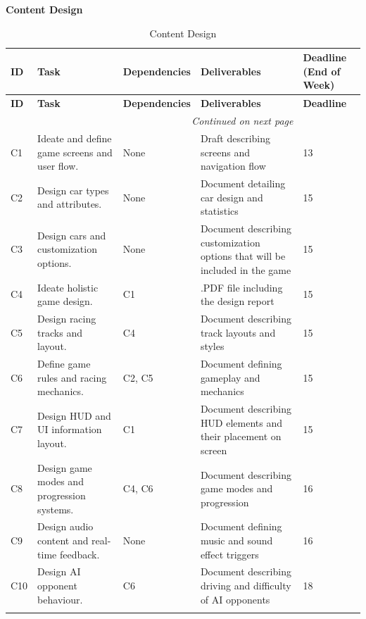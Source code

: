 \documentclass[12pt]{article}
\begin{document}
\endgroup


\noindent\textbf{Content Design}

\setlength{\LTpre}{6pt}
\setlength{\LTpost}{6pt}

\begingroup
\setlength{\parindent}{0pt}

\setlength{\widenby}{45mm} %

\setlength{\LTleft}{-0.5\widenby}
\setlength{\LTright}{-0.5\widenby}

\noindent\begin{longtable}{|l|p{}|p{}|p{}|p{}|}
\hline
\textbf{ID} & \textbf{Task} & \textbf{Dependencies} & \textbf{Deliverables} & \textbf{Deadline (End of Week)} \\
\hline
\endfirsthead

\hline
\textbf{ID} & \textbf{Task} & \textbf{Dependencies} & \textbf{Deliverables} & \textbf{Deadline} \\
\hline
\endhead

\hline
\multicolumn{4}{r}{\small\textit{Continued on next page}} \\
\endfoot

\hline
\endlastfoot

C1 & Ideate and define game screens and user flow. & None & Draft describing screens and navigation flow & 13 \\
\hline
C2 & Design car types and attributes. & None & Document detailing car design and statistics & 15 \\
\hline
C3 & Design cars and customization options. & None & Document describing customization options that will be included in the game & 15 \\
\hline
C4 & Ideate holistic game design. & C1 & .PDF file including the design report & 15 \\
\hline
C5 & Design racing tracks and layout. & C4 & Document describing track layouts and styles & 15 \\
\hline
C6 & Define game rules and racing mechanics. & C2, C5 & Document defining gameplay and mechanics & 15 \\
\hline
C7 & Design HUD and UI information layout. & C1 & Document describing HUD elements and their placement on screen & 15 \\
\hline
C8 & Design game modes and progression systems. & C4, C6 & Document describing game modes and progression & 16 \\
\hline
C9 & Design audio content and real-time feedback. & None & Document defining music and sound effect triggers & 16 \\
\hline
C10 & Design AI opponent behaviour. & C6 & Document describing driving and difficulty of AI opponents & 18 \\
\hline

\caption{Content Design}
\end{longtable}
\end{document}
